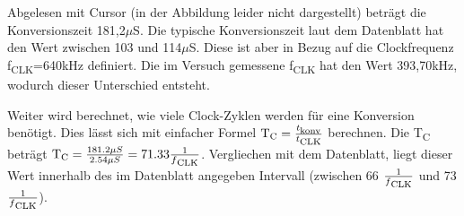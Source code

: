 Abgelesen mit Cursor (in der Abbildung leider nicht dargestellt) beträgt
die Konversionszeit 181,2$\mu$S. Die typische Konversionszeit laut dem Datenblatt
hat den Wert zwischen 103 und 114$\mu$S. Diese ist aber in Bezug auf die Clockfrequenz
f\textsubscript{CLK}=640kHz definiert. Die im Versuch gemessene f\textsubscript{CLK}
hat den Wert 393,70kHz, wodurch dieser Unterschied entsteht.\par

Weiter wird berechnet, wie viele Clock-Zyklen werden für eine Konversion benötigt.
Dies lässt sich mit einfacher Formel
$\text{T\textsubscript{C}}=\frac{t\textsubscript{konv}}{t\textsubscript{CLK}}$
berechnen. Die T\textsubscript{C} beträgt 
$\text{T\textsubscript{C}}=\frac{181.2\mu S}{2.54\mu S}=71.33\frac{1}{f\textsubscript{CLK}}$.
Vergliechen mit dem Datenblatt, liegt dieser Wert innerhalb des im Datenblatt
angegeben Intervall (zwischen 66 $\frac{1}{f\textsubscript{CLK}}$ und 73 $\frac{1}{f\textsubscript{CLK}}$).
